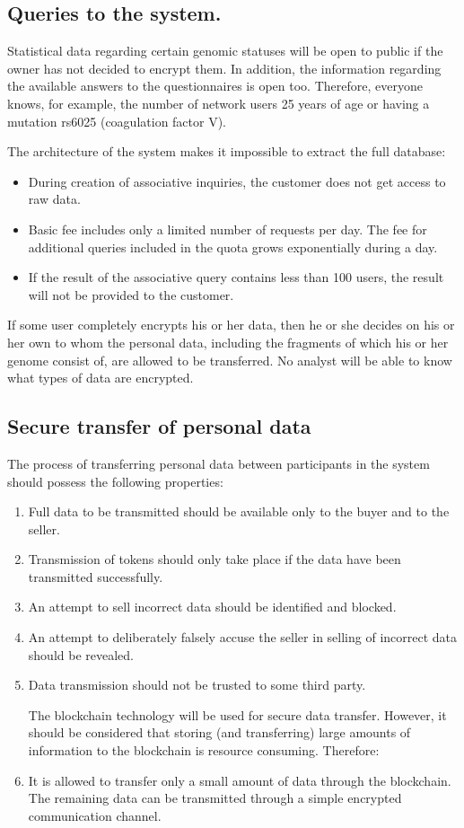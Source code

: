 \subsection{Queries to the system.}
Statistical data regarding certain genomic statuses will be open to public if the owner has not decided to encrypt them. In addition, the information regarding the available answers to the questionnaires is open too. Therefore, everyone knows, for example, the number of network users 25 years of age or having a mutation rs6025 (coagulation factor V).

The architecture of the system makes it impossible to extract the full database:
\begin{itemize}
\item During creation of associative inquiries, the customer does not get access to raw data.
\item Basic fee includes only a limited number of requests per day. The fee for additional queries included in the quota grows exponentially during a day.
\item If the result of the associative query contains less than 100 users, the result will not be provided to the customer.
\end{itemize}

If some user completely encrypts his or her data, then he or she decides on his or her own to whom the personal data, including the fragments of which his or her genome consist of, are allowed to be transferred. No analyst will be able to know what types of data are encrypted.

\subsection{Secure transfer of personal data}
The process of transferring personal data between participants in the system should possess the following properties:
\begin{enumerate}
\item Full data to be transmitted should be available only to the buyer and to the seller.
\item Transmission of tokens should only take place if the data have been transmitted successfully.
\item An attempt to sell incorrect data should be identified and blocked.
\item An attempt to deliberately falsely accuse the seller in selling of incorrect data should be revealed.
\item Data transmission should not be trusted to some third party.

\begin{note}
  The blockchain technology will be used for secure data transfer. However, it should be considered that storing (and transferring) large amounts of information to the blockchain is resource consuming. Therefore:
\end{note}

\item It is allowed to transfer only a small amount of data through the blockchain. The remaining data can be transmitted through a simple encrypted communication channel.
\end{enumerate}
